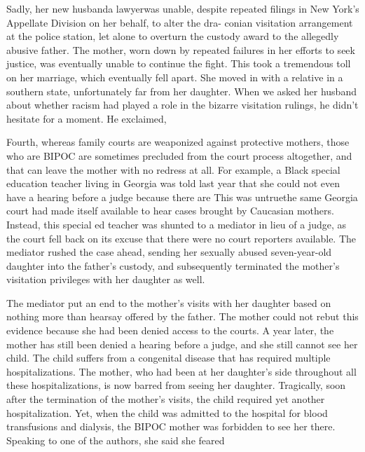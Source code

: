 Sadly, her new husband\mdash{}a lawyer\mdash{}was unable, despite 
repeated filings in New York's Appellate Division on her behalf, to alter the dra-
conian visitation arrangement at the police station, let alone to overturn
the custody award to the allegedly abusive father. The mother, worn
down by repeated failures in her efforts to seek justice, was eventually 
unable to continue the fight. This took a tremendous toll on her
marriage, which eventually fell apart. She moved in with a relative in a
southern state, unfortunately far from her daughter. When we asked her
husband about whether racism had played a role in the bizarre visitation
rulings, he didn’t hesitate for a moment. He exclaimed,  \pfl{}

Fourth, whereas family courts are weaponized against protective
mothers, those who are BIPOC are sometimes precluded from the court
process altogether, and that can leave the mother with no redress at all.
For example, a Black special education teacher living in Georgia was
told last year that she could not even have a hearing before a judge because there are  This was untrue\mdash{}the same
Georgia court had made itself available to hear cases brought by Caucasian mothers. Instead, this special ed teacher was shunted to a mediator in lieu of
a judge, as the court fell back on its excuse that there were no court
reporters available. The mediator rushed the case ahead, 
sending her sexually abused seven-year-old daughter 
into the father's custody, and subsequently 
terminated the mother's visitation privileges with her daughter
as well. \pfl{}

The mediator put an end to the mother’s visits with her daughter based
on nothing more than hearsay offered by the father. The mother could
not rebut this evidence because she had been denied access to the courts.
A year later, the mother has still been denied a hearing before a judge,
and she still cannot see her child. The child suffers from a congenital 
disease that has required multiple hospitalizations. The mother, who had
been at her daughter’s side throughout all these hospitalizations, is now
barred from seeing her daughter. Tragically, soon after the termination
of the mother's visits, the child required yet another hospitalization. Yet,
when the child was admitted to the hospital for blood transfusions and
dialysis, the BIPOC mother was forbidden to see her there. Speaking to
one of the authors, she said she feared  \pfl{}

